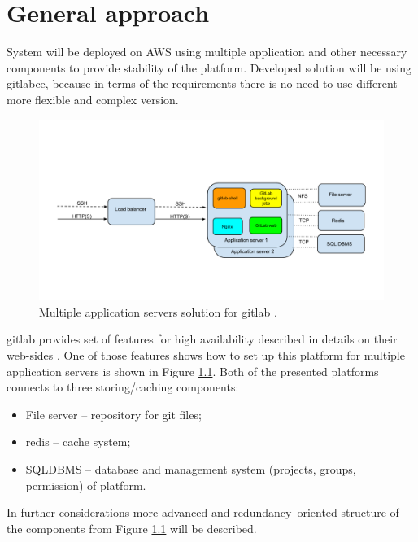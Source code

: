 \chapter{General approach} \label{chp:general-approach}
	System will be deployed on \gls{AWS} using multiple application and other necessary components to provide stability of the platform. Developed solution will be using \gls{gitlabce}, because in terms of the requirements there is no need to use different more flexible and complex version. 
	\begin{figure}[!htbp]
		\centering
		\includegraphics[width=1\textwidth]{img/Config_LB_appservers}
		\caption{Multiple application servers solution for \gls{gitlab} \cite{bib:gitlab-ha}.}
		\label{fig:multiple-application-servers}
	\end{figure} 
	\gls{gitlab} provides set of features for high availability described in details on their web-sides \cite{bib:gitlab-ha}. One of those features shows how to set up this platform for multiple application servers is shown in Figure \ref{fig:multiple-application-servers}.
	Both of the presented platforms connects to three storing/caching components:
	\begin{itemize}
		\item File server -- repository for \gls{git} files;
		\item \gls{redis} -- cache system;
		\item \gls{SQLDBMS} -- database and management system (projects, groups, permission) of platform.
	\end{itemize}
	In further considerations more advanced and redundancy--oriented structure of the components from Figure \ref{fig:multiple-application-servers} will be described. 
	
